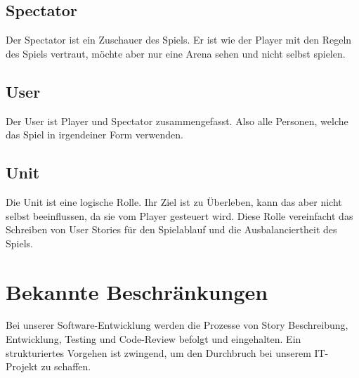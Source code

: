 \documentclass[a4paper, 11pt]{scrartcl}
\let\oldsection\section
\renewcommand\section{\clearpage\oldsection}
\begin{document}
\subsection{Spectator}
Der Spectator ist ein Zuschauer des Spiels. Er ist wie der Player mit den Regeln des Spiels vertraut, möchte aber nur eine Arena sehen und nicht selbst spielen.
\subsection{User}
Der User ist Player und Spectator zusammengefasst. Also alle Personen, welche das Spiel in irgendeiner Form verwenden.
\subsection{Unit}
Die Unit ist eine logische Rolle. Ihr Ziel ist zu Überleben, kann das aber nicht selbst beeinflussen, da sie vom Player gesteuert wird. Diese Rolle vereinfacht das Schreiben von User Stories für den Spielablauf und die Ausbalanciertheit des Spiels. 

\section{Bekannte Beschränkungen}

Bei unserer Software-Entwicklung werden die Prozesse von Story Beschreibung, Entwicklung, Testing und Code-Review befolgt und eingehalten.
Ein strukturiertes Vorgehen ist zwingend, um den Durchbruch bei unserem IT-Projekt zu schaffen.
\end{document}
